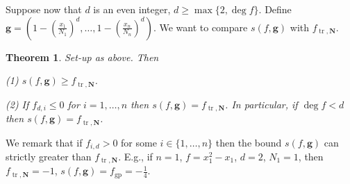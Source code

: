 \documentclass{amsart}
\newtheorem{thm}{Theorem}[section]
\theoremstyle{definition}
\begin{document}
Suppose now that $d$ is an even integer, $d \ge \max\{ 2, \deg f\}$. Define $\mathbf{g} = (1-(\frac{x_1}{N_1})^d,\dots,1-(\frac{x_n}{N_n})^d)$.
We want to compare $s(f,\mathbf{g})$ with $f_{\operatorname{tr},\mathbf{N}}$.
%
\begin{thm} \label{hypercube case} Set-up as above. Then  \

(1) $s(f,\mathbf{g}) \ge f_{\operatorname{tr},\mathbf{N}}$.

(2) If $f_{d,i}\le 0$ for $i=1,\dots,n$ then $s(f,\mathbf{g}) = f_{\operatorname{tr},\mathbf{N}}$.
In particular, if $\deg f <d$ then  $s(f,\mathbf{g}) = f_{\operatorname{tr},\mathbf{N}}$.
\end{thm}
%
We remark that if $f_{i,d}>0$ for some $i \in \{ 1,\dots, n\}$ then the bound $s(f,\mathbf{g})$ can strictly greater than $f_{\operatorname{tr},\mathbf{N}}$.
E.g., if $n=1$, $f=x_1^2-x_1$, $d=2$, $N_1=1$,
then $f_{\operatorname{tr},\mathbf{N}} = -1$, $s(f,\mathbf{g})=f_{\operatorname{\operatorname{gp}}}=-\frac{1}{4}$.
%
\end{document}
